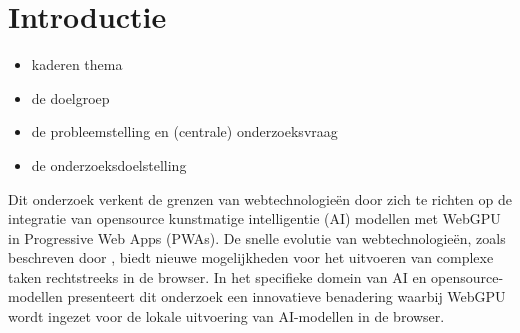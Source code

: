 
\section{Introductie}%
\label{sec:introductie}


\begin{itemize}
  \item kaderen thema
  \item de doelgroep
  \item de probleemstelling en (centrale) onderzoeksvraag
  \item de onderzoeksdoelstelling
\end{itemize}





Dit onderzoek verkent de grenzen van webtechnologieën door zich te richten op de integratie van opensource kunstmatige intelligentie (AI) modellen 
met WebGPU in Progressive Web Apps (PWAs). 
De snelle evolutie van webtechnologieën, zoals beschreven door \textcite{Shumylo2023}, 
biedt nieuwe mogelijkheden voor het uitvoeren van complexe taken rechtstreeks in de browser.
In het specifieke domein van AI en opensource-modellen presenteert dit onderzoek een innovatieve benadering 
waarbij WebGPU wordt ingezet voor de lokale uitvoering van AI-modellen in de browser.

